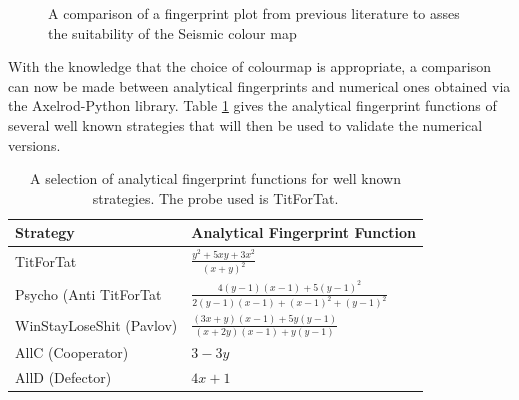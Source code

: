 \begin{figure}[hbtp!]
\centering
{}
\caption{A comparison of a fingerprint plot from previous literature to asses the suitability of the Seismic colour map \cite{Ashlock2008}}
\label{fig:WSLS-ashlock-comparison}
\end{figure}

With the knowledge that the choice of colourmap is appropriate, a comparison can now be made between analytical fingerprints and numerical ones obtained via the Axelrod-Python library.
Table \ref{tab:fingerprint-functions} gives the analytical fingerprint functions of several well known strategies that will then be used to validate the numerical versions.

\begin{table}[htbp!]
\centering
\renewcommand{\arraystretch}{2}
\setlength{\tabcolsep}{12pt}
\begin{tabular}{l l}
\toprule
Strategy & Analytical Fingerprint Function\\
\midrule
TitForTat &  $\displaystyle \frac{y^2 + 5xy + 3x^2}{(x + y)^2} $\\
Psycho (Anti TitForTat& $\displaystyle \frac{4(y-1)(x-1) + 5(y-1)^2}{2(y-1)(x-1) + (x-1)^2 + (y-1)^2} $ \\
WinStayLoseShit (Pavlov) & $\displaystyle \frac{(3x+y)(x-1) + 5y(y-1)}{(x+2y)(x-1) + y(y-1)} $\\
AllC (Cooperator) & $\displaystyle 3 - 3y $ \\
AllD (Defector) & $\displaystyle 4x + 1 $\\
\bottomrule
\end{tabular}
\caption{A selection of analytical fingerprint functions for well known strategies. The probe used is TitForTat.}
\label{tab:fingerprint-functions}
\end{table}

